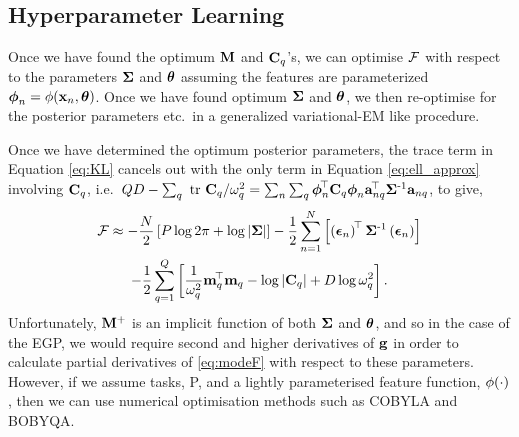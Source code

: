 \subsection{Hyperparameter Learning}
Once we have found the optimum $\mathbf{M}$ and $\mathbf{C}_q$'s, we can optimise
$\mathcal{F}$ with respect to the parameters $\mathbf{\Sigma}$ and $\boldsymbol\theta$ assuming the
features are parameterized $\boldsymbol\phi_n = \phi\!\left({{\mathbf{x}_n, \boldsymbol\theta}}\right)$. Once we
have found optimum $\mathbf{\Sigma}$ and $\boldsymbol\theta$, we then re-optimise for the
posterior parameters etc.\ in a generalized  variational-EM like procedure.

Once we have determined the optimum posterior parameters, the trace term in
Equation \eqref{eq:KL} cancels out with the only term in Equation \eqref{eq:ell_approx} 
involving $\mathbf{C}_q$, i.e.\ $QD -
\sum_q\mbox{ \rm tr }{\ensuremath{\mathbf{C}}_q}/\omega^2_q = 
\sum_n \sum_q \boldsymbol\phi_n^{\!\top}\mathbf{C}_q  \boldsymbol\phi_n\mathbf{a}_{nq}^{\!\top}\mathbf{\Sigma}^{\text{-}1} \mathbf{a}_{nq}$,
to give,
\begin{multline}
    \mathcal{F} \approx 
        - \frac{N}{2}\left[{P\log{2\pi} + \log\left|{\mathbf{\Sigma}}\right|}\right]
    - \frac{1}{2} \sum^N_{n=1} \left[{
        \left({\boldsymbol{ \epsilon }_n}\right)^{\!\top}
        \mathbf{\Sigma}^{\text{-}1}
        \left({\boldsymbol{ \epsilon }_n}\right)}\right] \\
        -\frac{1}{2} \sum^{Q}_{q=1} \left[{
        \frac{1}{\omega^2_q} \mathbf{m}_q^{\!\top}\mathbf{m}_q
        - \log\left|{\mathbf{C}_q}\right| + D \log \omega^2_q}\right].
    \label{eq:modeF}
\end{multline}
Unfortunately, $\mathbf{M}^{+}$ is an implicit function of both $\mathbf{\Sigma}$ and
$\boldsymbol\theta$, and so in the case of the EGP, we would require second and higher
derivatives of $\mathbf{g}$ in order to calculate partial derivatives of
\eqref{eq:modeF} with respect to these parameters. 
    However, if we assume  tasks, P, and a lightly
parameterised feature function, $\phi\!\left({{\cdot}}\right)$, then we can use numerical 
optimisation methods such as COBYLA and BOBYQA.

